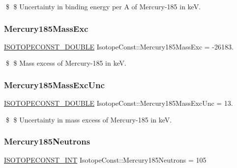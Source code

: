 \$ \$ Uncertainty in binding energy per A of Mercury-\/185 in keV. \mbox{\label{group___isotope_const-_mercury-_hg185_ga92428b1df3c99e8eb310743401c948a9}} 
\subsubsection{\texorpdfstring{Mercury185\+Mass\+Exc}{Mercury185MassExc}}
{\footnotesize\ttfamily \mbox{\hyperlink{group___isotope_const-_macros_ga8f45a7272ce02c0b4c65c44636ed719a}{I\+S\+O\+T\+O\+P\+E\+C\+O\+N\+S\+T\+\_\+\+D\+O\+U\+B\+LE}} Isotope\+Const\+::\+Mercury185\+Mass\+Exc = -\/26183.}

\$ \$ Mass excess of Mercury-\/185 in keV. \mbox{\label{group___isotope_const-_mercury-_hg185_ga9f1a0cd2883d80c11db7fc27e89fa2ea}} 
\subsubsection{\texorpdfstring{Mercury185\+Mass\+Exc\+Unc}{Mercury185MassExcUnc}}
{\footnotesize\ttfamily \mbox{\hyperlink{group___isotope_const-_macros_ga8f45a7272ce02c0b4c65c44636ed719a}{I\+S\+O\+T\+O\+P\+E\+C\+O\+N\+S\+T\+\_\+\+D\+O\+U\+B\+LE}} Isotope\+Const\+::\+Mercury185\+Mass\+Exc\+Unc = 13.}

\$ \$ Uncertainty in mass excess of Mercury-\/185 in keV. \mbox{\label{group___isotope_const-_mercury-_hg185_gaf9e31f9636b1c4852fb7fb64d160bd60}} 
\subsubsection{\texorpdfstring{Mercury185\+Neutrons}{Mercury185Neutrons}}
{\footnotesize\ttfamily \mbox{\hyperlink{group___isotope_const-_macros_ga5f18360b3e99483a35c32d789e62621c}{I\+S\+O\+T\+O\+P\+E\+C\+O\+N\+S\+T\+\_\+\+I\+NT}} Isotope\+Const\+::\+Mercury185\+Neutrons = 105}

